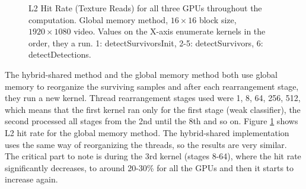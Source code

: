 \begin{figure}[h]
\centering{}
	\caption{L2 Hit Rate (Texture Reads) for all three GPUs throughout the computation. Global memory method, $16 \times 16$ block size, $1920 \times 1080$ video. Values on the X-axis enumerate kernels in the order, they a run. 1: detectSurvivorsInit, 2-5: detectSurvivors, 6: detectDetections.}
	\label{fig:l2-hit-rate-global}
\end{figure}

The hybrid-shared method and the global memory method both use global memory to reorganize the surviving samples and after each rearrangement stage, they run a new kernel. Thread rearrangement stages used were 1, 8, 64, 256, 512, which means that the first kernel ran only for the first stage (weak classifier), the second processed all stages from the 2nd until the 8th and so on. Figure \ref{fig:l2-hit-rate-global} shows L2 hit rate for the global memory method. The hybrid-shared implementation uses the same way of reorganizing the threads, so the results are very similar. The critical part to note is during the 3rd kernel (stages 8-64), where the hit rate significantly decreases, to around 20-30\% for all the GPUs and then it starts to increase again.

